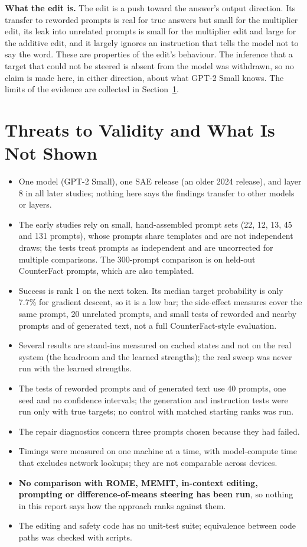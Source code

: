 \documentclass[12pt,a4paper]{report}
\begin{document}
\textbf{What the edit is.} The edit is a push toward the answer's output direction. Its transfer to reworded prompts is real for true answers but small for the multiplier edit, its leak into unrelated prompts is small for the multiplier edit and large for the additive edit, and it largely ignores an instruction that tells the model not to say the word. These are properties of the edit's behaviour. The inference that a target that could not be steered is absent from the model was withdrawn, so no claim is made here, in either direction, about what GPT-2 Small knows. The limits of the evidence are collected in Section~\ref{sec:threats}.

\section{Threats to Validity and What Is Not Shown}\label{sec:threats}

\begin{itemize}
  \item One model (GPT-2 Small), one SAE release (an older 2024 release), and layer 8 in all later studies; nothing here says the findings transfer to other models or layers.
  \item The early studies rely on small, hand-assembled prompt sets (22, 12, 13, 45 and 131 prompts), whose prompts share templates and are not independent draws; the tests treat prompts as independent and are uncorrected for multiple comparisons. The 300-prompt comparison is on held-out CounterFact prompts, which are also templated.
  \item Success is rank 1 on the next token. Its median target probability is only 7.7\% for gradient descent, so it is a low bar; the side-effect measures cover the same prompt, 20 unrelated prompts, and small tests of reworded and nearby prompts and of generated text, not a full CounterFact-style evaluation.
  \item Several results are stand-ins measured on cached states and not on the real system (the headroom and the learned strengths); the real sweep was never run with the learned strengths.
  \item The tests of reworded prompts and of generated text use 40 prompts, one seed and no confidence intervals; the generation and instruction tests were run only with true targets; no control with matched starting ranks was run.
  \item The repair diagnostics concern three prompts chosen because they had failed.
  \item Timings were measured on one machine at a time, with model-compute time that excludes network lookups; they are not comparable across devices.
  \item \textbf{No comparison with ROME, MEMIT, in-context editing, prompting or difference-of-means steering has been run}, so nothing in this report says how the approach ranks against them.
  \item The editing and safety code has no unit-test suite; equivalence between code paths was checked with scripts.
\end{itemize}
\end{document}
